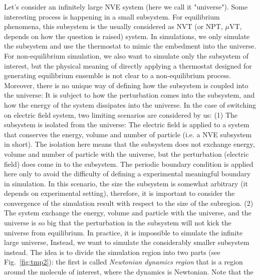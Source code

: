 \documentclass[a4paper,preprint,onecolumn]{revtex4-1}
\begin{document}


Let's consider an infinitely large NVE system (here we call it
"universe"). Some interesting process is happening in a small
subsystem. For equilibrium phenomena, this subsystem is the usually
considered as NVT (or NPT, $\mu$VT, depends on how the question is
raised) system.  In simulations, we only simulate the subsystem and
use the thermostat to mimic the embedment into the universe.  For
non-equilibrium simulation, we also want to simulate only the
subsystem of interest, but the physical meaning of directly applying a
thermostat designed for generating equilibrium ensemble is not clear
to a non-equilibrium process. Moreover, there is no unique way of
defining how the subsystem is coupled into the universe: It is subject
to how the perturbation comes into the subsystem, and how the energy
of the system dissipates into the universe. In the case of switching on
electric field system, two limiting scenarios are considered by us: (1)
The subsystem is isolated from the universe: The electric field is
applied to a system that conserves the energy, volume and number of
particle (i.e. a NVE subsystem in short).  The isolation here means
that the subsystem does not exchange energy, volume and number of
particle with the universe, but the perturbation (electric field) does
come in to the subsystem.  The periodic boundary condition is applied
here only to avoid the difficulty of defining a experimental
meaningful boundary in simulation.  In this scenario, the size the
subsystem is somewhat arbitrary (it depends on experimental setting),
therefore, it is important to consider the convergence of the
simulation result with respect to the size of the subregion.  (2) The
system exchange the energy, volume and particle with the universe, and
the universe is so big that the perturbation in the subsystem will not
kick the universe from equilibrium.  In practice, it is impossible to
simulate the infinite large universe, Instead, we want to simulate the
considerably smaller subsystem instead.  The idea is to divide the
simulation region into two parts (see Fig.~\ref{fig:tmp2}): the first
is called \emph{Newtonian dynamics region} that is a region around the
molecule of interest, where the dynamics is Newtonian. Note that the
\end{document}
